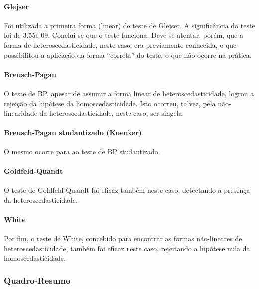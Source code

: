 \documentclass[a4paper, 12pt]{article}
\let\oldparagraph\paragraph
\renewcommand{\paragraph}[1]{\oldparagraph{#1}\mbox{}}
\begin{document}
\hypertarget{glejser-1}{%
\paragraph{Glejser}\label{glejser-1}}

Foi utilizada a primeira forma (linear) do teste de Glejser. A
significância do teste foi de 3.55e-09. Conclui-se que o teste funciona.
Deve-se atentar, porém, que a forma de heteroscedasticidade, neste caso,
era previamente conhecida, o que possibilitou a aplicação da forma
``correta'' do teste, o que não ocorre na prática.

\hypertarget{breusch-pagan-1}{%
\paragraph{Breusch-Pagan}\label{breusch-pagan-1}}

O teste de BP, apesar de assumir a forma linear de heteroscedasticidade,
logrou a rejeição da hipótese da homoscedasticidade. Isto ocorreu,
talvez, pela não-linearidade da heteroscedasticidade, neste caso, ser
singela.

\hypertarget{breusch-pagan-studantizado-koenker-1}{%
\paragraph{Breusch-Pagan studantizado
(Koenker)}\label{breusch-pagan-studantizado-koenker-1}}

O mesmo ocorre para ao teste de BP studantizado.

\hypertarget{goldfeld-quandt-1}{%
\paragraph{Goldfeld-Quandt}\label{goldfeld-quandt-1}}

O teste de Goldfeld-Quandt foi eficaz também neste caso, detectando a
presença da heteroscedasticidade.

\hypertarget{white-1}{%
\paragraph{White}\label{white-1}}

Por fim, o teste de White, concebido para encontrar as formas
não-lineares de heteroscedasticidade, também foi eficaz neste caso,
rejeitando a hipótese nula da homoscedasticidade.

\hypertarget{quadro-resumo-1}{%
\subsubsection{Quadro-Resumo}\label{quadro-resumo-1}}
\end{document}
